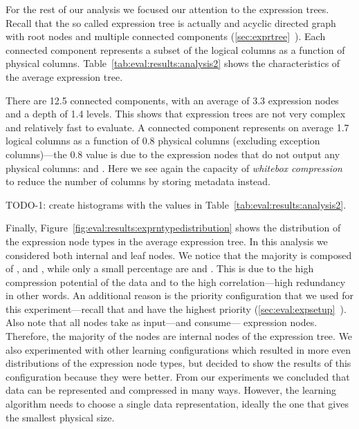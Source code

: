 For the rest of our analysis we focused our attention to the expression trees. Recall that the so called expression tree is actually and acyclic directed graph with root nodes and multiple connected components (\ref{sec:exprtree}~). Each connected component represents a subset of the logical columns as a function of physical columns. Table~\ref{tab:eval:results:analysis2} shows the characteristics of the average expression tree.



There are 12.5 connected components, with an average of 3.3 expression nodes and a depth of 1.4 levels. This shows that expression trees are not very complex and relatively fast to evaluate. A connected component represents on average 1.7 logical columns as a function of 0.8 physical columns (excluding exception columns)---the 0.8 value is due to the expression nodes that do not output any physical columns:  and . Here we see again the capacity of \textit{whitebox compression} to reduce the number of columns by storing metadata instead.

TODO-1: create histograms with the values in Table~\ref{tab:eval:results:analysis2}.

Finally, Figure~\ref{fig:eval:results:exprntypedistribution} shows the distribution of the expression node types in the average expression tree. In this analysis we considered both internal and leaf nodes. We notice that the majority is composed of ,  and , while only a small percentage are  and . This is due to the high  compression potential of the data and to the high correlation---high redundancy in other words. An additional reason is the priority configuration that we used for this experiment---recall that  and  have the highest priority (\ref{sec:eval:expsetup}~). Also note that all  nodes take as input---and consume--- expression nodes. Therefore, the majority of the  nodes are internal nodes of the expression tree. We also experimented with other learning configurations which resulted in more even distributions of the expression node types, but decided to show the results of this configuration because they were better. From our experiments we concluded that data can be represented and compressed in many ways. However, the learning algorithm needs to choose a single data representation, ideally the one that gives the smallest physical size.

